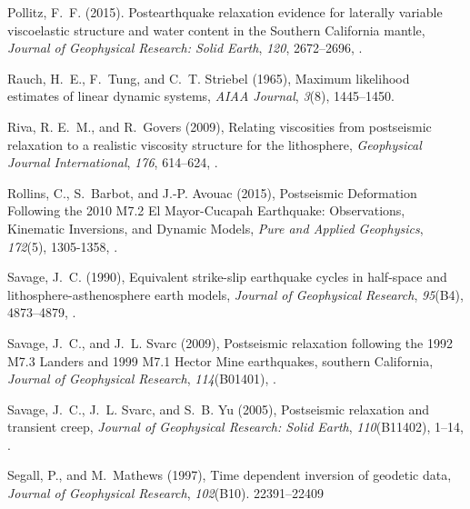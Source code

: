 \documentclass[draft,linenumbers]{AGUJournal}
\begin{document}
\begin{thebibliography}{52}
Pollitz, F.~F. (2015). {Postearthquake relaxation evidence for laterally variable viscoelastic structure and water content in the Southern California mantle}, \textit{Journal of Geophysical Research: Solid Earth}, \textit{120}, 2672--2696, .

Rauch, H.~E., F.~Tung, and C.~T. Striebel (1965), {Maximum likelihood estimates of linear dynamic systems}, \textit{AIAA Journal}, \textit{3}(8), 1445--1450.

Riva, R. E.~M., and R.~Govers (2009), {Relating viscosities from postseismic relaxation to a realistic viscosity structure for the lithosphere}, \textit{Geophysical Journal International}, \textit{176}, 614--624, .

Rollins, C., S.~Barbot, and J.-P. Avouac (2015), {Postseismic Deformation Following the 2010 M7.2 El Mayor-Cucapah Earthquake: Observations, Kinematic Inversions, and Dynamic Models}, \textit{Pure and Applied Geophysics}, \textit{172}(5), 1305-1358, .

Savage, J.~C. (1990), {Equivalent strike-slip earthquake cycles in half-space and lithosphere-asthenosphere earth models}, \textit{Journal of Geophysical Research}, \textit{95}(B4), 4873--4879, .

Savage, J.~C., and J.~L. Svarc (2009), {Postseismic relaxation following the 1992 M7.3 Landers and 1999 M7.1 Hector Mine earthquakes, southern California}, \textit{Journal of Geophysical Research}, \textit{114}(B01401), .

Savage, J.~C., J.~L. Svarc, and S.~B. Yu (2005), {Postseismic relaxation and transient creep}, \textit{Journal of Geophysical Research: Solid Earth}, \textit{110}(B11402), 1--14, .

Segall, P., and M.~Mathews (1997), {Time dependent inversion of geodetic data}, \textit{Journal of Geophysical Research}, \textit{102}(B10). 22391--22409 


\end{thebibliography}
\end{document}
